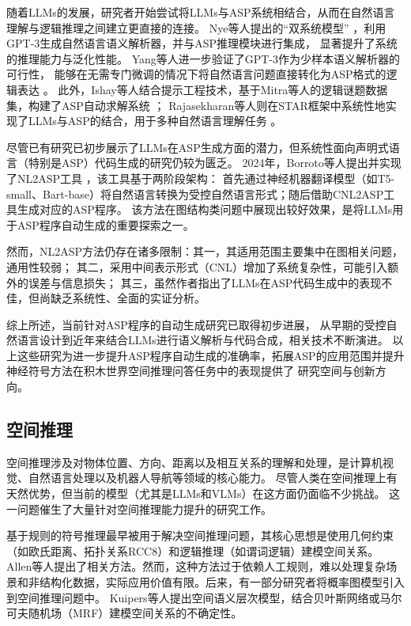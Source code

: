 随着LLMs的发展，研究者开始尝试将LLMs与ASP系统相结合，从而在自然语言理解与逻辑推理之间建立更直接的连接。
Nye等人提出的“双系统模型” \cite{nye2021improving}，利用GPT-3生成自然语言语义解析器，并与ASP推理模块进行集成，
显著提升了系统的推理能力与泛化性能。
Yang等人进一步验证了GPT-3作为少样本语义解析器的可行性，
能够在无需专门微调的情况下将自然语言问题直接转化为ASP格式的逻辑表达 \cite{yang2023coupling}。
此外，Ishay等人结合提示工程技术，基于Mitra等人的逻辑谜题数据集，构建了ASP自动求解系统 \cite{mitra2016addressing}；
Rajasekharan等人则在STAR框架中系统性地实现了LLMs与ASP的结合，用于多种自然语言理解任务 \cite{rajasekharan2023reliable}。

尽管已有研究已初步展示了LLMs在ASP生成方面的潜力，但系统性面向声明式语言（特别是ASP）代码生成的研究仍较为匮乏。
2024年，Borroto等人提出并实现了NL2ASP工具 \cite{borroto2024automaticcompositionaspprograms}，该工具基于两阶段架构：
首先通过神经机器翻译模型（如T5-small、Bart-base）将自然语言转换为受控自然语言形式；随后借助CNL2ASP工具生成对应的ASP程序。
该方法在图结构类问题中展现出较好效果，是将LLMs用于ASP程序自动生成的重要探索之一。

然而，NL2ASP方法仍存在诸多限制：其一，其适用范围主要集中在图相关问题，通用性较弱；
其二，采用中间表示形式（CNL）增加了系统复杂性，可能引入额外的误差与信息损失；
其三，虽然作者指出了LLMs在ASP代码生成中的表现不佳，但尚缺乏系统性、全面的实证分析。

综上所述，当前针对ASP程序的自动生成研究已取得初步进展，
从早期的受控自然语言设计到近年来结合LLMs进行语义解析与代码合成，相关技术不断演进。
以上这些研究为进一步提升ASP程序自动生成的准确率，拓展ASP的应用范围并提升神经符号方法在积木世界空间推理问答任务中的表现提供了
研究空间与创新方向。
\subsection{空间推理}
空间推理涉及对物体位置、方向、距离以及相互关系的理解和处理，是计算机视觉、自然语言处理以及机器人导航等领域的核心能力。
尽管人类在空间推理上有天然优势，但当前的模型（尤其是LLMs和VLMs）在这方面仍面临不少挑战。
这一问题催生了大量针对空间推理能力提升的研究工作。

基于规则的符号推理最早被用于解决空间推理问题，其核心思想是使用几何约束（如欧氏距离、拓扑关系RCC8）和逻辑推理（如谓词逻辑）建模空间关系。
Allen等人提出了相关方法。然而，这种方法过于依赖人工规则，难以处理复杂场景和非结构化数据，实际应用价值有限。后来，有一部分研究者将概率图模型引入到空间推理问题中。
Kuipers等人提出空间语义层次模型，结合贝叶斯网络或马尔可夫随机场（MRF）建模空间关系的不确定性。

